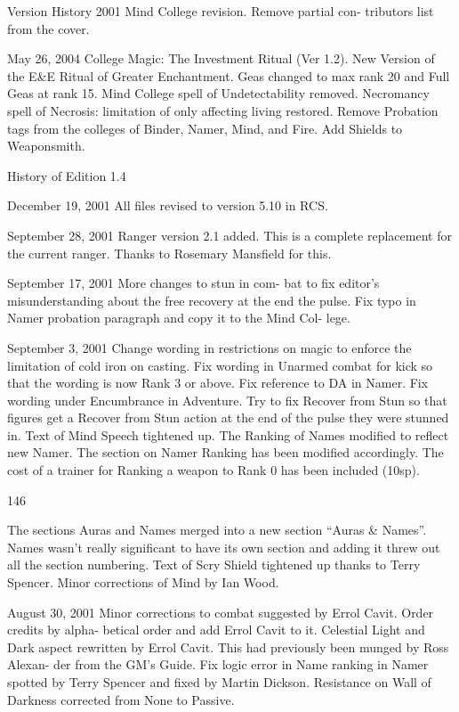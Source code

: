 \begin{Chapter}{Version History}
2001  Mind  College  revision.  Remove  partial  con-
tributors list from the cover. 

May  26,  2004  College  Magic:  The  Investment 
Ritual  (Ver  1.2).  New  Version  of  the  E\&E  Ritual 
of  Greater  Enchantment.  Geas  changed  to  max 
rank  20  and  Full  Geas  at  rank  15.  Mind  College 
spell  of  Undetectability  removed.  Necromancy 
spell of Necrosis: limitation of only affecting living 
restored. Remove Probation tags from the colleges 
of  Binder,  Namer, Mind, and  Fire.  Add  Shields  to 
Weaponsmith. 

History of Edition 1.4 

December  19,  2001  All  files  revised  to  version 
5.10 in RCS. 

September  28,  2001  Ranger  version  2.1  added. 
This  is  a  complete  replacement  for  the  current 
ranger. Thanks to Rosemary Mansfield for this. 

September 17, 2001 More changes to stun in com-
bat  to  fix  editor’s  misunderstanding about the  free 
recovery  at  the  end  the  pulse.  Fix  typo  in  Namer 
probation  paragraph  and  copy  it  to  the  Mind  Col-
lege. 

September  3,  2001  Change  wording in  restrictions 
on  magic  to  enforce  the  limitation  of  cold  iron  on 
casting.  Fix  wording  in  Unarmed  combat  for  kick 
so  that  the  wording  is  now  Rank  3  or  above.  Fix 
reference  to  DA  in  Namer.  Fix  wording  under 
Encumbrance  in  Adventure.  Try  to  fix  Recover 
from Stun so that figures get a Recover from Stun 
action at the end of the pulse they were stunned in. 
Text of Mind Speech tightened up. The Ranking of 
Names modified to reflect new Namer. The section 
on Namer Ranking has been modified accordingly. 
The cost of a trainer for Ranking a weapon to Rank 
0 has been included (10sp). 

146 

The sections Auras and Names merged into a new 
section  “Auras  \&  Names”.  Names  wasn’t  really 
significant  to  have  its  own  section  and  adding  it 
threw  out  all  the  section  numbering.  Text  of  Scry 
Shield tightened up thanks to Terry Spencer. Minor 
corrections of Mind by Ian Wood. 

August  30,  2001  Minor  corrections  to  combat 
suggested  by  Errol  Cavit.  Order  credits  by  alpha-
betical  order  and  add  Errol  Cavit  to  it.  Celestial 
Light  and  Dark  aspect  rewritten  by  Errol  Cavit. 
This had previously been munged by Ross Alexan-
der from the GM’s Guide. Fix logic error in Name 
ranking  in  Namer  spotted  by  Terry  Spencer  and 
fixed  by  Martin  Dickson.  Resistance  on  Wall  of 
Darkness corrected from None to Passive. 


\end{Chapter}
